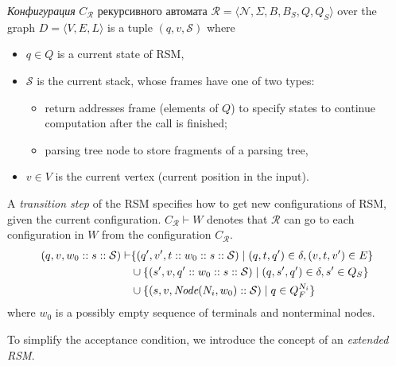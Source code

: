\begin{definition}
    \emph{Конфигурация} $C_{\mathcal{R}}$ рекурсивного автомата $\mathcal{R}=\langle \mathcal{N},\Sigma,B,B_S,Q,Q_S \rangle$ over the graph $D=\langle V,E,L \rangle$ is a tuple $(q,v,\mathcal{S})$ where 
    \begin{itemize}
        \item $q \in Q$ is a current state of RSM,
        \item $\mathcal{S}$ is the current stack, whose frames have one of two types: 
        \begin{itemize} 
            \item return addresses frame (elements of $Q$) to specify states to continue computation after the call is finished;
            \item parsing tree node to store fragments of a parsing tree,
        \end{itemize}
        \item $v \in V$ is the current vertex (current position in the input).
    \end{itemize}
\end{definition}

\begin{definition}\label{def:rsm_transition}
    A \emph{transition step} of the RSM specifies how to get new configurations of RSM, given the current configuration. $C_{\mathcal{R}} \vdash W$ denotes that $\mathcal{R}$ can go to each configuration in $W$ from the configuration $C_{\mathcal{R}}$.
    \begin{align*}
    (q,v,w_0::s::\mathcal{S})  \vdash & \{ (q',v',t::w_0::s::\mathcal{S}) \mid (q,t,q') \in \delta, (v,t,v') \in E\} \\
                       & \cup \{(s', v, q'::w_0::s::\mathcal{S}) \mid (q,s',q') \in \delta, s' \in Q_S \} \\
                       & \cup \{(s,v,\emph{Node}(N_i, w_0)::\mathcal{S}) \mid q \in Q_F^{N_i}\}
    \end{align*}
    where $w_0$ is a possibly empty sequence of terminals and nonterminal nodes. 
\end{definition}

To simplify the acceptance condition, we introduce the concept of an \textit{extended RSM}. 

